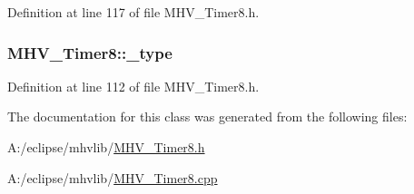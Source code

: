 \-Definition at line 117 of file \-M\-H\-V\-\_\-\-Timer8.\-h.

\hypertarget{class_m_h_v___timer8_a10c0fdfbbe901b923ea7fb1c0fc9690c}{
\subsubsection[{\-\_\-type}]{ {\bf \-M\-H\-V\-\_\-\-Timer8\-::\-\_\-type}}}
\label{class_m_h_v___timer8_a10c0fdfbbe901b923ea7fb1c0fc9690c}


\-Definition at line 112 of file \-M\-H\-V\-\_\-\-Timer8.\-h.



\-The documentation for this class was generated from the following files\-:\begin{DoxyCompactItemize}
\item 
\-A\-:/eclipse/mhvlib/\hyperlink{_m_h_v___timer8_8h}{\-M\-H\-V\-\_\-\-Timer8.\-h}\item 
\-A\-:/eclipse/mhvlib/\hyperlink{_m_h_v___timer8_8cpp}{\-M\-H\-V\-\_\-\-Timer8.\-cpp}\end{DoxyCompactItemize}
